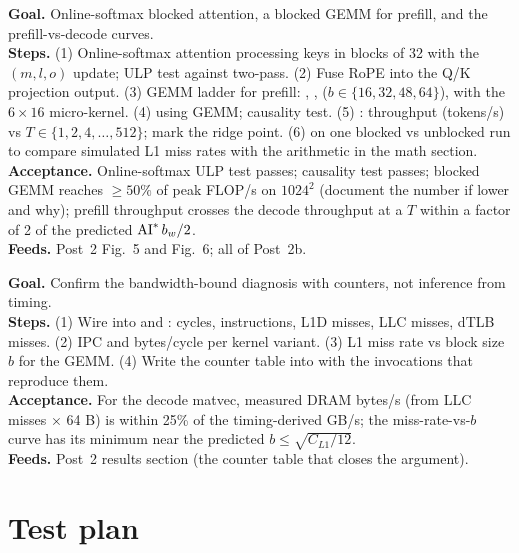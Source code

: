 \textbf{Goal.} Online-softmax blocked attention, a blocked GEMM for prefill, and the prefill-vs-decode curves.\\
\textbf{Steps.} (1) Online-softmax attention processing keys in blocks of 32 with the $(m,l,o)$ update; ULP test against two-pass. (2) Fuse RoPE into the Q/K projection output. (3) GEMM ladder for prefill: , ,  ($b\in\{16,32,48,64\}$),  with the $6\times 16$ micro-kernel. (4)  using GEMM; causality test. (5) : throughput (tokens/s) vs $T\in\{1,2,4,\dots,512\}$; mark the ridge point. (6)  on one blocked vs unblocked run to compare simulated L1 miss rates with the arithmetic in the math section.\\
\textbf{Acceptance.} Online-softmax ULP test passes; causality test passes; blocked GEMM reaches $\ge 50\%$ of peak FLOP/s on $1024^2$ (document the number if lower and why); prefill throughput crosses the decode throughput at a $T$ within a factor of 2 of the predicted $\operatorname{AI}^\ast b_w/2$.\\
\textbf{Feeds.} Post~2 Fig.~5 and Fig.~6; all of Post~2b.

\textbf{Goal.} Confirm the bandwidth-bound diagnosis with counters, not inference from timing.\\
\textbf{Steps.} (1) Wire  into  and : cycles, instructions, L1D misses, LLC misses, dTLB misses. (2) IPC and bytes/cycle per kernel variant. (3) L1 miss rate vs block size $b$ for the GEMM. (4) Write the counter table into  with the  invocations that reproduce them.\\
\textbf{Acceptance.} For the decode matvec, measured DRAM bytes/s (from LLC misses $\times$ 64 B) is within 25\% of the timing-derived GB/s; the miss-rate-vs-$b$ curve has its minimum near the predicted $b \le \sqrt{C_{L1}/12}$.\\
\textbf{Feeds.} Post~2 results section (the counter table that closes the argument).

\section{Test plan}

